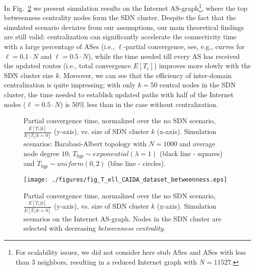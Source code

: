 In Fig.~\ref{fig:ell-caida-betweenness} we present simulation results on the Internet AS-graph\footnote{For scalability issues, we did not consider here stub ASes and ASes with less than 3 neighbors, resulting in a reduced Internet graph with $N=11527$.}, where the top betweenness centrality nodes form the SDN cluster. Despite the fact that the simulated scenario deviates from our assumptions, our main theoretical findings are still valid: centralization can significantly accelerate the connectivity time with a large percentage of ASes (i.e., $\ell$-partial convergence, see, e.g., curves for $\ell = 0.1\cdot N$ and $\ell = 0.5\cdot N$), while the time needed till every AS has received the updated routes (i.e., total convergence $E[T_{c}]$) improves more slowly with the SDN cluster size $k$. Moreover, we can see that the efficiency of inter-domain centralization is quite impressing; with only $k=50$ central nodes in the SDN cluster, the time needed to establish updated paths with half of the Internet nodes ($\ell=0.5\cdot N$) is $50\%$ less than in the case without centralization.




\begin{figure}
\centering
{}
\caption{Partial convergence time, normalized over the no SDN scenario, $\frac{E[T_{\ell}|k]}{E[T_{\ell}|k=0]}$ (y-axis), vs. size of SDN cluster $k$ (x-axis). Simulation scenarios: Barabasi-Albert topology with $N=1000$ and average node degree $10$; $T_{bgp}\sim exponential(\lambda=1)$ (black line - squares) and $T_{bgp}\sim uniform(0,2)$ (blue line - circles).}
\label{fig:Tell-vs-k}
\end{figure}



\begin{figure}
\centering
\texttt{[image: ./figures/fig\_T\_ell\_CAIDA\_dataset\_betweenness.eps]}
\caption{Partial convergence time, normalized over the no SDN scenario, $\frac{E[T_{\ell}|k]}{E[T_{\ell}|k=0]}$ (y-axis), vs. size of SDN cluster $k$ (x-axis). Simulation scenarios on the Internet AS-graph. Nodes in the SDN cluster are selected with decreasing \textit{betweenness centrality}.}
\label{fig:ell-caida-betweenness}
\end{figure}



